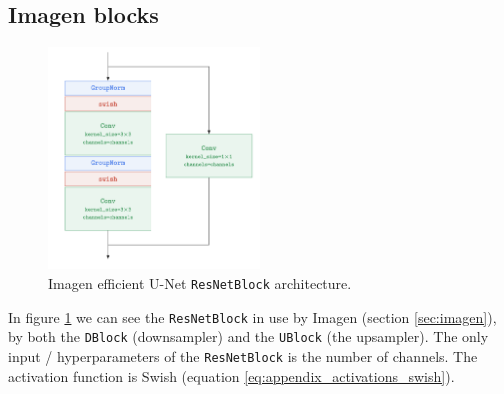 \subsection{Imagen blocks}
\label{appendix:imagen}

\begin{figure}
    \centering
    \includegraphics[width=0.5\textwidth]{images/appendix/imagen/unet_resnetblock.png}
    \caption{Imagen efficient U-Net \texttt{ResNetBlock} architecture.}
    \label{fig:appendix_imagen_resnetblock}
\end{figure}

In figure \ref{fig:appendix_imagen_resnetblock} we can see the \texttt{ResNetBlock} in use by Imagen (section \ref{sec:imagen}), by both the \texttt{DBlock} (downsampler) and the \texttt{UBlock} (the upsampler). The only input / hyperparameters of the \texttt{ResNetBlock} is the number of channels. The activation function is Swish (equation \ref{eq:appendix_activations_swish}).

